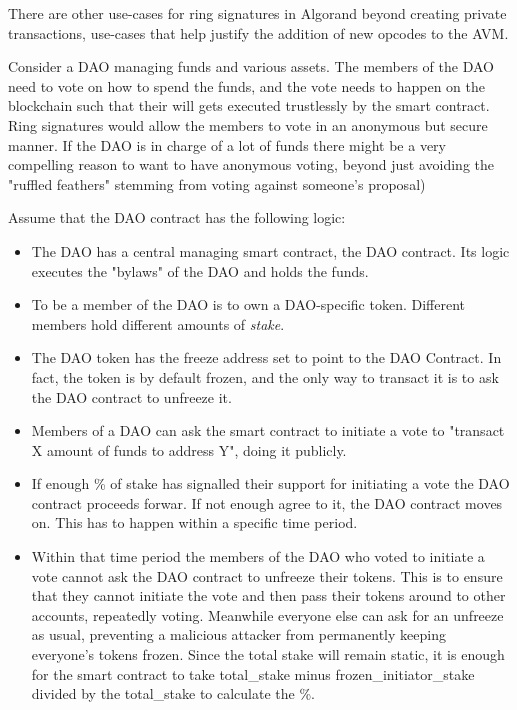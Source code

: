 \documentclass[9pt]{article}
\begin{document}
There are other use-cases for ring signatures in Algorand beyond creating private transactions, use-cases that help justify the addition of new opcodes to the AVM.

Consider a DAO managing funds and various assets. The members of the DAO need to vote on how to spend the funds, and the vote needs to happen on the blockchain such that their will gets executed trustlessly by the smart contract. Ring signatures would allow the members to vote in an anonymous but secure manner. If the DAO is in charge of a lot of funds there might be a very compelling reason to want to have anonymous voting, beyond just avoiding the "ruffled feathers" stemming from voting against someone's proposal)

Assume that the DAO contract has the following logic:

\begin{itemize}
    \item The DAO has a central managing smart contract, the DAO contract. Its logic executes the "bylaws" of the DAO and holds the funds.
    \item To be a member of the DAO is to own a DAO-specific token. Different members hold different amounts of \textit{stake}.
    \item The DAO token has the freeze address set to point to the DAO Contract. In fact, the token is by default frozen, and the only way to transact it is to ask the DAO contract to unfreeze it.
    \item Members of a DAO can ask the smart contract to initiate a vote to "transact X amount of funds to address Y", doing it publicly. 
    \item If enough \% of stake has signalled their support for initiating a vote the DAO contract proceeds forwar. If not enough agree to it, the DAO contract moves on. This has to happen within a specific time period.
    \item Within that time period the members of the DAO who voted to initiate a vote cannot ask the DAO contract to unfreeze their tokens. This is to ensure that they cannot initiate the vote and then pass their tokens around to other accounts, repeatedly voting. Meanwhile everyone else can ask for an unfreeze as usual, preventing a malicious attacker from permanently keeping everyone's tokens frozen. Since the total stake will remain static, it is enough for the smart contract to take total\_stake minus frozen\_initiator\_stake divided by the total\_stake to calculate the \%.
\end{itemize}
\end{document}
